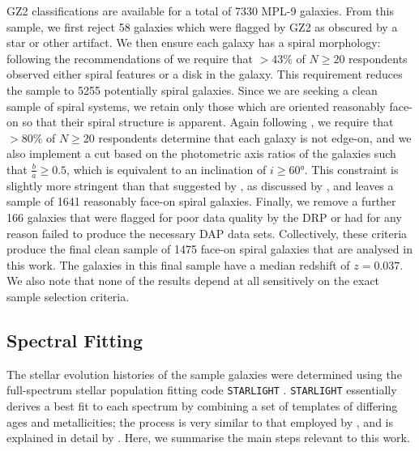 \documentclass[fleqn,usenatbib]{mnras}
\begin{document}
GZ2 classifications are available for a total of 7330 MPL-9 galaxies. From this sample, we first reject 58 galaxies which were flagged by GZ2 as obscured by a star or other artifact. We then ensure each galaxy has a spiral morphology: following the recommendations of \citet{Willett2013GalaxySurvey} we require that $> 43\%$ of $N \geq 20$ respondents observed either spiral features or a disk in the galaxy. This requirement reduces the sample to 5255 potentially spiral galaxies. Since we are seeking a clean sample of spiral systems, we retain only those which are oriented reasonably face-on so that their spiral structure is apparent. Again following \citet{Willett2013GalaxySurvey}, we require that $> 80\%$ of $N \geq 20$ respondents determine that each galaxy is not edge-on, and we also implement a cut based on the photometric axis ratios of the galaxies such that $\frac{b}{a} \geq 0.5$, which is equivalent to an inclination of $i \geq \ang{60}$. This constraint is slightly more stringent than that suggested by \citet{Hart2017GalaxyAngles}, as discussed by \citet{Peterken2020SDSS-IVGalaxies}, and leaves a sample of 1641 reasonably face-on spiral galaxies. Finally, we remove a further 166 galaxies that were flagged for poor data quality by the DRP or had for any reason failed to produce the necessary DAP data sets. Collectively, these criteria produce the final clean sample of 1475 face-on spiral galaxies that are analysed in this work. The galaxies in this final sample have a median redshift of $z = 0.037$. We also note that none of the results depend at all sensitively on the exact sample selection criteria.


\subsection{Spectral Fitting}
\label{subsec:STARLIGHT}

The stellar evolution histories of the sample galaxies were determined using the full-spectrum stellar population fitting code \texttt{STARLIGHT} \citep{CidFernandes2005Semi-empiricalMethod}. \texttt{STARLIGHT} essentially derives a best fit to each spectrum by combining a set of templates of differing ages and metallicities; the process is very similar to that employed by \citet{Greener2020SDSS-IVGalaxies}, and is explained in detail by \citet{Peterken2020SDSS-IVGalaxies}. Here, we summarise the main steps relevant to this work.
\end{document}
